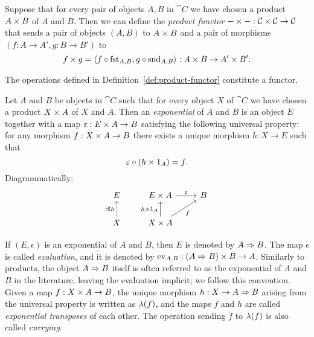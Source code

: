 \begin{defn} \label{def:product-functor}
Suppose that for every pair of objects $A, B$ in $\cat{C}$ we have chosen a product $\cprod{A}{B}$ of $A$ and $B$. Then we can define the \emph{product functor} $\cprod{-}{-} : \prodcat{\cat{C}}{\cat{C}} \to \cat{C}$ that sends a pair of objects $(A, B)$ to $\cprod{A}{B}$ and a pair of morphisms $(f : A \to A', g : B \to B')$ to
\[ \cprod{f}{g} = \mpair{f \circ \mfst[A,B]}{g \circ \msnd[A,B]}
    : \cprod{A}{B} \to \cprod{A'}{B'}. \]
\end{defn}
\begin{prop}
The operations defined in Definition~\ref{def:product-functor} constitute a functor.
\end{prop}

\begin{defn} \label{def:exponentials}
Let $A$ and $B$ be objects in $\cat{C}$ such that for every object $X$ of $\cat{C}$ we have chosen a product $\cprod{X}{A}$ of $X$ and $A$. Then an \emph{exponential} of $A$ and $B$ is an object $E$ together with a map $\epsilon : \cprod{E}{A} \to B$ satisfying the following universal property: for any morphism $f : \cprod{X}{A} \to B$ there exists a unique morphism $h : X \to E$ such that
\[ \epsilon \circ (\cprod{h}{\id[A]}) = f. \]
Diagrammatically:
\[\begin{tikzcd}
	E & {\cprod{E}{A}} & B \\
	X & {\cprod{X}{A}}
	\arrow["f"', from=2-2, to=1-3]
	\arrow["\epsilon", from=1-2, to=1-3]
	\arrow["{\cprod{h}{\id[A]}}", from=2-2, to=1-2]
	\arrow["{\exists! h}", dashed, from=2-1, to=1-1]
\end{tikzcd}\]
\end{defn}

If $(E, \epsilon)$ is an exponential of $A$ and $B$, then $E$ is denoted by $\cexp{A}{B}$. The map $\epsilon$ is called \emph{evaluation}, and it is denoted by $\mev[A,B] : \cprod{(\cexp{A}{B})}{B} \to A$. Similarly to products, the object $\cexp{A}{B}$ itself is often referred to as the exponential of $A$ and $B$ in the literature, leaving the evaluation implicit; we follow this convention. Given a map $f : \cprod{X}{A} \to B$, the unique morphism $h : X \to \cexp{A}{B}$ arising from the universal property is written as $\mcurry{f}$, and the maps $f$ and $h$ are called \emph{exponential transposes} of each other. The operation sending $f$ to $\mcurry{f}$ is also called \emph{currying}.


